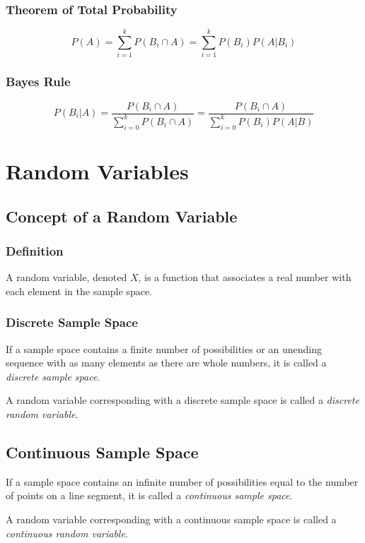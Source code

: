 \documentclass{book}
\begin{document}
\subsection{Theorem of Total Probability}
$$P(A) = \sum_{i=1}^k P(B_i \cap A) = \sum_{i=1}^k P(B_i)P(A|B_i)$$

\subsection{Bayes Rule}
$$P(B_i|A) 
= \frac{P(B_i \cap A)}{\sum_{i=0}^k P(B_i \cap A)} 
= \frac{P(B_i \cap A)}{\sum_{i=0}^k P(B_i)P(A|B)}$$

\chapter{Random Variables}

\section{Concept of a Random Variable}

\subsection{Definition}
A random variable, denoted $X$, is a function that associates a real number with each element in the sample space.

\subsection{Discrete Sample Space}
If a sample space contains a finite number of possibilities or an unending sequence with as many elements as there are whole numbers, it is called a \emph{discrete sample space}.

A random variable corresponding with a discrete sample space is called a \emph{discrete random variable}.

\section{Continuous Sample Space}
If a sample space contains an infinite number of possibilities equal to the number of points on a line segment, it is called a \emph{continuous sample space}.

A random variable corresponding with a continuous sample space is called a \emph{continuous random variable}.
\end{document}
